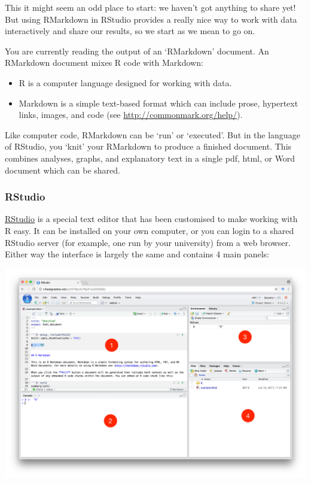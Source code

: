 \documentclass[]{article}
\providecommand{\tightlist}{%
  \setlength{\itemsep}{0pt}\setlength{\parskip}{0pt}}
\begin{document}
This it might seem an odd place to start: we haven't got anything to share yet!
But using RMarkdown in RStudio provides a really nice way to work with data
interactively and share our results, so we start as we mean to go on.

You are currently reading the output of an `RMarkdown' document. An RMarkdown
document mixes R code with Markdown:

\begin{itemize}
\tightlist
\item
  R is a computer language designed for working with data.
\item
  Markdown is a simple text-based format which can include prose, hypertext
  links, images, and code (see \url{http://commonmark.org/help/}).
\end{itemize}

Like computer code, RMarkdown can be `run' or `executed'. But in the language of
RStudio, you `knit' your RMarkdown to produce a finished document. This combines
analyses, graphs, and explanatory text in a single pdf, html, or Word document
which can be shared.

\hypertarget{rstudio}{%
\subsubsection*{RStudio}\label{rstudio}}

\href{https://www.rstudio.com/products/rstudio/}{RStudio} is a special text editor
that has been customised to make working with R easy. It can be installed on
your own computer, or you can login to a shared RStudio server (for example, one
run by your university) from a web browser. Either way the interface is largely
the same and contains 4 main panels:

\includegraphics[width=41.53in]{media/rstudio-mainwindow}
\end{document}
